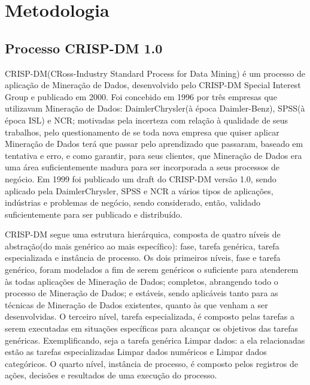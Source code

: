 \chapter{Metodologia}


\section{Processo CRISP-DM 1.0}


\cite{ML_know} \cite{balance-anarchy} \cite{ML_debt} \cite{replicability}

\cite{CRISP-DM-KDD-SEMMA}

CRISP-DM(CRoss-Industry Standard Process for Data Mining) é um processo de aplicação de Mineração de Dados, desenvolvido pelo CRISP-DM Special Interest Group e publicado em 2000. Foi concebido em 1996 por três empresas que utilizavam Mineração de Dados: DaimlerChrysler(à época Daimler-Benz), SPSS(à época ISL) e NCR; motivadas pela incerteza com relação à qualidade de seus trabalhos, pelo questionamento de se toda nova empresa que quiser aplicar Mineração de Dados terá que passar pelo aprendizado que passaram, baseado em tentativa e erro, e como garantir, para seus clientes, que Mineração de Dados era uma área suficientemente madura para ser incorporada a seus processos de negócio. Em 1999 foi publicado um draft do CRISP-DM versão 1.0, sendo aplicado pela DaimlerChrysler, SPSS e NCR a vários tipos de aplicações, indústrias e problemas de negócio, sendo considerado, então, validado suficientemente para ser publicado e distribuído\cite{CRISP-DM}.

CRISP-DM segue uma estrutura hierárquica, composta de quatro níveis de abstração(do mais genérico ao mais específico): fase, tarefa genérica, tarefa especializada e instância de processo. Os dois primeiros níveis, fase e tarefa genérico, foram modelados a fim de serem genéricos o suficiente para atenderem às todas aplicações de Mineração de Dados; completos, abrangendo todo o processo de Mineração de Dados; e estáveis, sendo aplicáveis tanto para as técnicas de Mineração de Dados existentes, quanto às que venham a ser desenvolvidas. O terceiro nível, tarefa especializada, é composto pelas tarefas a serem executadas em situações específicas para alcançar os objetivos das tarefas genéricas. Exemplificando, seja a tarefa genérica Limpar dados: a ela relacionadas estão as tarefas especializadas Limpar dados numéricos e Limpar dados categóricos. O quarto nível, instância de processo, é composto pelos registros de ações, decisões e resultados de uma execução do processo.\cite{CRISP-DM}

